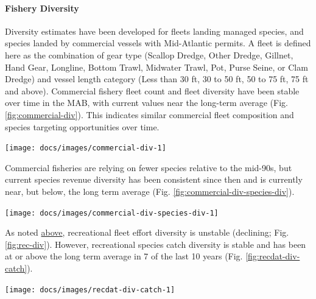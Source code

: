 \documentclass[
  10pt,
]{article}
\let\origfigure\figure
\let\endorigfigure\endfigure
\renewenvironment{figure}[1][2] {
    \expandafter\origfigure\expandafter[H]
} {
    \endorigfigure
}
\begin{document}
\hypertarget{fishery-diversity}{%
\paragraph{Fishery Diversity}\label{fishery-diversity}}

Diversity estimates have been developed for fleets landing managed
species, and species landed by commercial vessels with Mid-Atlantic
permits. A fleet is defined here as the combination of gear type
(Scallop Dredge, Other Dredge, Gillnet, Hand Gear, Longline, Bottom
Trawl, Midwater Trawl, Pot, Purse Seine, or Clam Dredge) and vessel
length category (Less than 30 ft, 30 to 50 ft, 50 to 75 ft, 75 ft and
above). Commercial fishery fleet count and fleet diversity have been
stable over time in the MAB, with current values near the long-term
average (Fig. \ref{fig:commercial-div}). This indicates similar
commercial fleet composition and species targeting opportunities over
time.

\begin{figure}

{\centering \texttt{[image: docs/images/commercial-div-1]} 

}

\caption{Fleet diversity and fleet count in the Mid-Atlantic.}\label{fig:commercial-div}
\end{figure}

Commercial fisheries are relying on fewer species relative to the
mid-90s, but current species revenue diversity has been consistent since
then and is currently near, but below, the long term average (Fig.
\ref{fig:commercial-div-species-div}).

\begin{figure}

{\centering \texttt{[image: docs/images/commercial-div-species-div-1]} 

}

\caption{Species revenue diversity in the Mid-Atlantic.}\label{fig:commercial-div-species-div}
\end{figure}

As noted \protect\hyperlink{recreational-opportunities}{above},
recreational fleet effort diversity is unstable (declining; Fig.
\ref{fig:rec-div}). However, recreational species catch diversity is
stable and has been at or above the long term average in 7 of the last
10 years (Fig. \ref{fig:recdat-div-catch}).

\begin{figure}

{\centering \texttt{[image: docs/images/recdat-div-catch-1]} 

}

\caption{Diversity of recreational catch in the Mid-Atlantic.}\label{fig:recdat-div-catch}
\end{figure}
\end{document}
